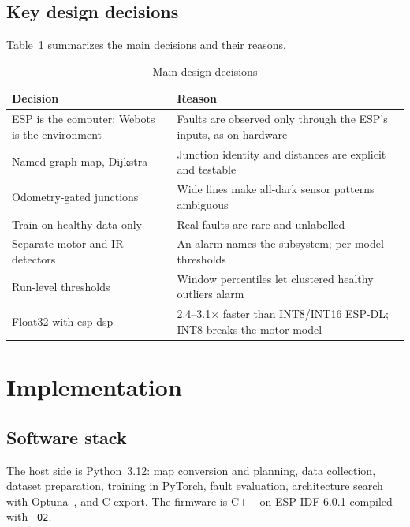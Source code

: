 \documentclass[conference]{IEEEtran}
\begin{document}
\subsection{Key design decisions}
Table~\ref{tab:decisions} summarizes the main decisions and their reasons.

\begin{table}[t]
\caption{Main design decisions}
\label{tab:decisions}
\centering
\footnotesize
\begin{tabular}{@{}p{2.55cm}p{5.3cm}@{}}
\toprule
Decision & Reason \\
\midrule
ESP is the computer; Webots is the environment & Faults are observed only through the ESP's inputs, as on hardware \\
Named graph map, Dijkstra & Junction identity and distances are explicit and testable \\
Odometry-gated junctions & Wide lines make all-dark sensor patterns ambiguous \\
Train on healthy data only & Real faults are rare and unlabelled \\
Separate motor and IR detectors & An alarm names the subsystem; per-model thresholds \\
Run-level thresholds & Window percentiles let clustered healthy outliers alarm \\
Float32 with esp-dsp & 2.4--3.1$\times$ faster than INT8/INT16 ESP-DL; INT8 breaks the motor model \\
\bottomrule
\end{tabular}
\end{table}

\section{Implementation}

\subsection{Software stack}
The host side is Python~3.12: map conversion and planning, data collection,
dataset preparation, training in PyTorch,
fault evaluation, architecture search with Optuna~\cite{optuna}, and C export.
The firmware is C++ on ESP-IDF 6.0.1 compiled with \texttt{-O2}.
\end{document}
